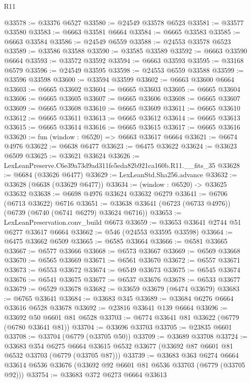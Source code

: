 \begin{lexlean}{R11}
\begin{coremodule}
@33578 := @33376 @6527
@33580 := @24549 @33578 @6523
@33581 := @33577 @33580
@33583 := @6663 @33581 @6664
@33584 := @6665 @33583
@33585 := @6663 @33584
@33586 := @24549 @6559
@33588 := @24553 @33578 @6523
@33589 := @33586 @33588
@33590 := @33585 @33589
@33592 := @6663 @33590 @6664
@33593 := @33572 @33592
@33594 := @6663 @33593
@33595 := @33168 @6579
@33596 := @24549 @33595
@33598 := @24553 @6559 @33588
@33599 := @33596 @33598
@33600 := @33594 @33599
@33602 := @6663 @33600 @6664
@33603 := @6665 @33602
@33604 := @6665 @33603
@33605 := @6665 @33604
@33606 := @6665 @33605
@33607 := @6665 @33606
@33608 := @6665 @33607
@33609 := @6665 @33608
@33610 := @6665 @33609
@33611 := @6665 @33610
@33612 := @6665 @33611
@33613 := @6665 @33612
@33614 := @6665 @33613
@33615 := @6665 @33614
@33616 := @6665 @33615
@33617 := @6665 @33616
@33620 := fun (window : @6520) => @6663 @33617 @6664
@33621 := @6674 @4976
@33622 := @6638 @6477
@33623 := @6475 @33622
@33624 := @33623 @6509
@33625 := @33621 @33624
@33626 := LexLeanPreserve.C6e39a73d9ad311fe5eda82b921ca160b.R11.__fits_35
@33628 := @6684 (@33626 @6477)
@33629 := LexLeanStd.Sha256.advance
@33632 := @33628 (@6638 (@33629 @6477))
@33634 := (window : @6520) -> @33625 @33632
@33638 := @6698 @4976 @33624 @33632 @6279
@33641 := @6706 (@6713 @33622) @6716
@33651 := @33638 @33641 (@6723 (@6733 @4976)) (@6739 (@6740 (@6741 @6279) @33624 @6716))
@33653 := LexLeanPreservation.conv_build @6673
@33659 := @33653 @33641 @2744 @51 @6277 @33617 @6664
@33662 := @546 (@24553 @33595 @33598)
@33664 := @6475 @33662 @6509
@33665 := @6585 @33664
@33666 := @6581 @33665
@33667 := @6577 @33666
@33668 := @6573 @33667
@33669 := @6569 @33668
@33670 := @6565 @33669
@33671 := @6561 @33670
@33672 := @6557 @33671
@33673 := @6553 @33672
@33674 := @6549 @33673
@33675 := @6545 @33674
@33676 := @6541 @33675
@33677 := @6537 @33676
@33678 := @6533 @33677
@33679 := @6529 @33678
@33682 := @33659 @33679 (@6474 @33679)
@33683 := @6765 @33641
@33684 := @33683 @345
@33689 := @33684 @6276 @6664 @33616 @6528 @33678
@33692 := @23816 @33641 @139 @6664
@33696 := @33692 @50 @6601 @81 @6528
@33703 := @6774 @33641 @81 @33622 (@6779 (@6780 @33641 @81))
@33704 := @33696 @33703
@33705 := @23835 @6601
@33708 := @33704 (@6779 (@33705 @50))
@33709 := @33689 @33708
@33724 := @33683
    @354
    @6275
    @6664
    @33615
    @6532
    @33677
    (@33692 @87 @6601 @81 @6532 @33703 (@6779 (@33705 @87)))
@33739 := @33683
    @363
    @6274
    @6664
    @33614
    @6536
    @33676
    (@33692 @92 @6601 @81 @6536 @33703 (@6779 (@33705 @92)))
@33754 := @33683
    @372
    @6273
    @6664
    @33613

\end{coremodule}
\end{lexlean}
